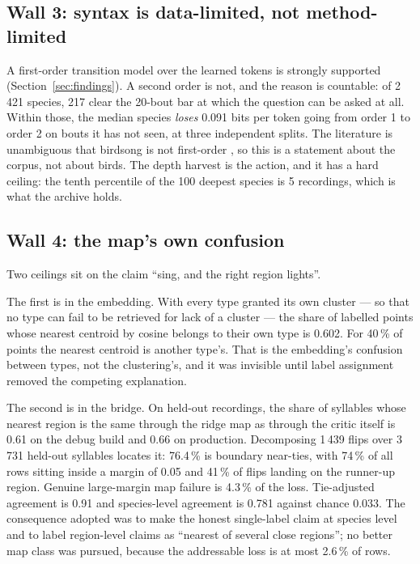 \documentclass[10pt,twocolumn,a4paper]{article}
\begin{document}
\subsection{Wall 3: syntax is data-limited, not method-limited}

A first-order transition model over the learned tokens is strongly supported
(Section~\ref{sec:findings}). A second order is not, and the reason is countable: of 2\,421
species, 217 clear the 20-bout bar at which the question can be asked at all. Within those,
the median species \emph{loses} 0.091 bits per token going from order 1 to order 2 on bouts
it has not seen, at three independent splits.
The literature is unambiguous that birdsong is not
first-order \citep{jin2011,lu2025}, so this is a statement about the corpus, not about
birds. The depth harvest is the action, and it has a hard ceiling: the tenth percentile of
the 100 deepest species is 5 recordings, which is what the archive holds.

\subsection{Wall 4: the map's own confusion}

Two ceilings sit on the claim ``sing, and the right region lights''.

The first is in the embedding. With every type granted its own cluster --- so that no type
can fail to be retrieved for lack of a cluster --- the share of labelled points whose
nearest centroid by cosine belongs to their own type is 0.602. For 40\,\% of points the
nearest centroid is another type's. That is the embedding's confusion between types, not
the clustering's, and it was invisible until label assignment removed the competing
explanation.

The second is in the bridge. On held-out recordings, the share of syllables whose nearest
region is the same through the ridge map as through the critic itself is 0.61 on the debug
build and 0.66 on production. Decomposing 1\,439 flips over 3\,731 held-out syllables
locates it: 76.4\,\% is boundary near-ties, with 74\,\% of all rows sitting inside a margin
of 0.05 and 41\,\% of flips landing on the runner-up region. Genuine large-margin map
failure is 4.3\,\% of the loss. Tie-adjusted agreement is 0.91 and species-level agreement
is 0.781 against chance 0.033. The consequence adopted was to make the honest single-label
claim at species level and to label region-level claims as ``nearest of several close
regions''; no better map class was pursued, because the addressable loss is at most
2.6\,\% of rows.
\end{document}
